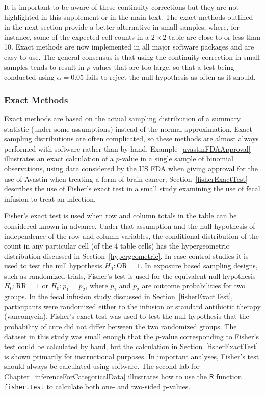 It is important to be aware of these continuity corrections but they are not highlighted in this supplement or in the main text. The exact methods outlined in the next section provide a better alternative in small samples, where, for instance, some of the expected cell counts in a $2 \times 2$ table are close to or less than 10.  Exact methods are now implemented in all major software packages and are easy to use.   The general consensus is that using the continuity correction in small samples tends to result in $p$-values that are too large, so that a test being conducted using $\alpha = 0.05$ fails to reject the null hypothesis as often as it should.

\subsubsection{Exact Methods}

Exact methods are based on the actual sampling distribution of a summary statistic (under some assumptions) instead of the normal approximation.  Exact sampling distributions are often complicated, so these methods are almost always performed with software rather than by hand. Example~\ref{avastinFDAApproval} illustrates an exact calculation of a $p$-value in a single sample of binomial observations, using data considered by the US FDA when giving approval for the use of Avastin when treating a form of brain cancer; Section~\ref{fisherExactTest} describes the use of Fisher's exact test in a small study examining the use of fecal infusion to treat an infection.

Fisher's exact test is used when row and column totals in the table can be considered known in advance.  Under that assumption and the null hypothesis of independence of the row and column variables, the conditional distribution of the count in any particular cell (of the 4 table cells) has the hypergeometric distribution discussed in Section~\ref{hypergeometric}. In case-control studies it is used to test the null hypothesis $H_0: \text{OR} = 1$.    In exposure based sampling designs, such as randomized trials, Fisher's test is used for the equivalent null hypothesis $H_0: \text{RR} = 1$ or $H_0: p_1 = p_2$, where $p_1$ and $p_2$ are outcome probabilities for two groups. In the fecal infusion study discussed in Section~\ref{fisherExactTest}, participants were randomized either to the infusion or standard antibiotic therapy (vancomycin). Fisher's exact test was used to test the null hypothesis that the probability of cure did not differ between the two randomized groups.  The dataset in this study was small enough that the $p$-value corresponding to Fisher's test could be calculated by hand, but the calculation in Section~\ref{fisherExactTest} is shown primarily for instructional purposes. In important analyses, Fisher's test should always be calculated using software.  The second lab for Chapter~\ref{inferenceForCategoricalData} illustrates how to use the $\textsf{R}$ function \texttt{fisher.test} to calculate both one- and two-sided p-values.

